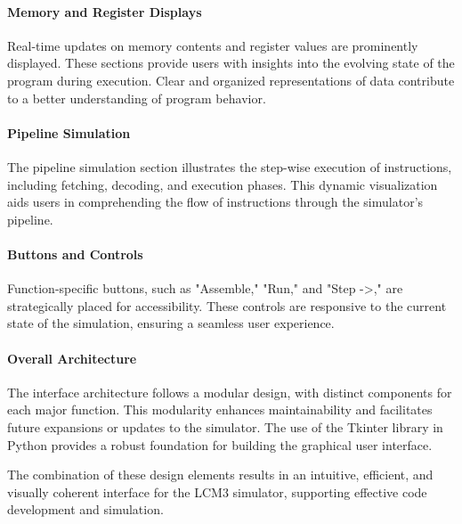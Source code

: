 \documentclass{article}
\begin{document}
\paragraph{Memory and Register Displays}
Real-time updates on memory contents and register values are prominently displayed. These sections provide users with insights into the evolving state of the program during execution. Clear and organized representations of data contribute to a better understanding of program behavior.

\paragraph{Pipeline Simulation}
The pipeline simulation section illustrates the step-wise execution of instructions, including fetching, decoding, and execution phases. This dynamic visualization aids users in comprehending the flow of instructions through the simulator's pipeline.

\paragraph{Buttons and Controls}
Function-specific buttons, such as "Assemble," "Run," and "Step ->," are strategically placed for accessibility. These controls are responsive to the current state of the simulation, ensuring a seamless user experience.

\paragraph{Overall Architecture}
The interface architecture follows a modular design, with distinct components for each major function. This modularity enhances maintainability and facilitates future expansions or updates to the simulator. The use of the Tkinter library in Python provides a robust foundation for building the graphical user interface.

The combination of these design elements results in an intuitive, efficient, and visually coherent interface for the LCM3 simulator, supporting effective code development and simulation.
\end{document}
